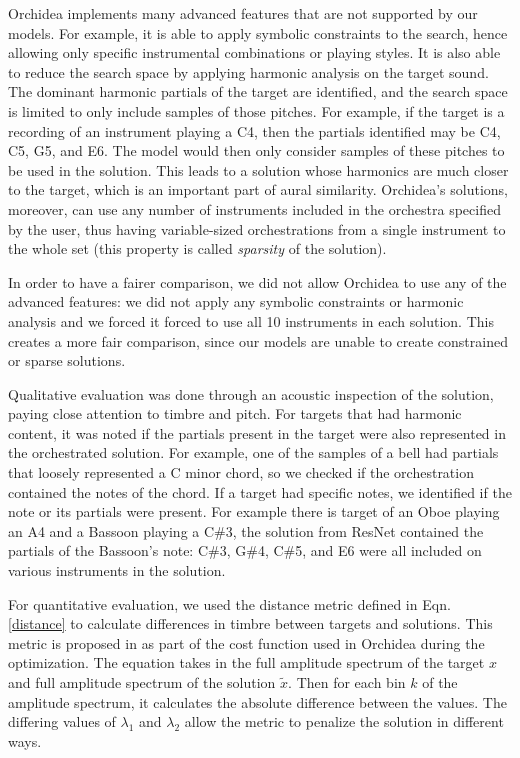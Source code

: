 \documentclass[runningheads,a4paper]{llncs}
\begin{document}
Orchidea implements many advanced features that are not supported by our models. For example, it is able to apply symbolic constraints to the search, hence allowing only specific instrumental combinations or playing styles. It is also able to reduce the search space by applying harmonic analysis on the target sound.
The dominant harmonic partials of the target are identified, and the search space is limited to only include samples of those pitches. For example, if the target is a recording of an instrument playing a C4, then the partials identified may be C4, C5, G5, and E6. The model would then only consider samples of these pitches to be used in the solution. This leads to a solution whose harmonics are much closer to the target, which is an important part of aural similarity.
Orchidea's solutions, moreover, can use any number of instruments included in the orchestra specified by the user, thus having variable-sized orchestrations from a single instrument to the whole set (this property is called \emph{sparsity} of the solution).

In order to have a fairer comparison, we did not allow Orchidea to use any of the advanced features: we did not apply any symbolic constraints or harmonic analysis and we forced it forced to use all 10 instruments in each solution. This creates a more fair comparison, since our models are unable to create constrained or sparse solutions.

Qualitative evaluation was done through an acoustic inspection of the solution, paying close attention to timbre and pitch. For targets that had harmonic content, it was noted if the partials present in the target were also represented in the orchestrated solution. For example, one of the samples of a bell had partials that loosely represented a C minor chord, so we checked if the orchestration contained the notes of the chord. If a target had specific notes, we identified if the note or its partials were present. For example there is target of an Oboe playing an A4 and a Bassoon playing a C\#3, the solution from ResNet contained the partials of the Bassoon's note: C\#3, G\#4, C\#5, and E6 were all included on various instruments in the solution.

For quantitative evaluation, we used the distance metric defined in Eqn. \ref{distance} to calculate differences in timbre between targets and solutions. This metric is proposed in \cite{Cella2020} as part of the cost function used in Orchidea during the optimization. The equation takes in the full amplitude spectrum of the target $x$ and full amplitude spectrum of the solution $\tilde{x}$. Then for each bin $k$ of the amplitude spectrum, it calculates the absolute difference between the values. The differing values of $\lambda_1$ and $\lambda_2$ allow the metric to penalize the solution in different ways.
\end{document}
